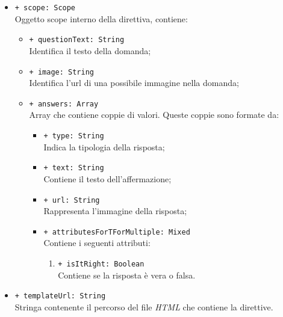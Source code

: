 \begin{itemize}
\begin{itemize}
				\item \texttt{+ scope: Scope} \\ Oggetto scope interno della direttiva, contiene:
				\begin{itemize}
					\item \texttt{+ questionText: String} \\ Identifica il testo della domanda;
					\item \texttt{+ image: String} \\ Identifica l'url di una possibile immagine nella domanda;
					\item \texttt{+ answers: Array} \\ Array che contiene coppie di valori. Queste coppie sono formate da:
					\begin{itemize}
						\item \texttt{+ type: String} \\ Indica la tipologia della risposta;
						\item \texttt{+ text: String} \\ Contiene il testo dell'affermazione;
						\item \texttt{+ url: String} \\ Rappresenta l'immagine della risposta;
						\item \texttt{+ attributesForTForMultiple: Mixed} \\ Contiene i seguenti attributi:
						\begin{enumerate}
							\item \texttt{+ isItRight: Boolean} \\ Contiene se la risposta è vera o falsa.
						\end{enumerate}
					\end{itemize}
				\end{itemize}
				\item \texttt{+ templateUrl: String} \\ Stringa contenente il percorso del file \textit{HTML} che contiene la direttive.
			\end{itemize}
		\end{itemize}																	